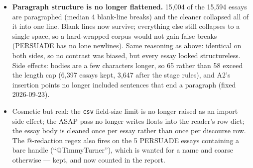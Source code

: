 \documentclass{article}
\begin{document}
\begin{itemize}
\begin{itemize}
                A/B pair, so it is rendered into the header exactly as the hiring header states the target
                role, and omitted where the corpus has none (ASAP). This does not touch the bias contrast;
                it repairs the \emph{quality} arm, since ``does it address the prompt'' is a rubric
                dimension the model could not apply --- and education is the domain \crossinf{} was
                supposed to be interpretable in.
          \item \textbf{Paragraph structure is no longer flattened.} 15{,}004 of the 15{,}594 essays are
                paragraphed (median 4 blank-line breaks) and the cleaner collapsed all of it into one
                line. Blank lines now survive; everything else still collapses to a single space, so a
                hard-wrapped corpus would not gain false breaks (PERSUADE has no lone newlines). Same
                reasoning as above: identical on both sides, so no contrast was biased, but every essay
                looked structureless. Side effects: bodies are a few characters longer, so 65 rather than
                58 exceed the length cap (6{,}397 essays kept, 3{,}647 after the stage rules), and A2's
                insertion points no longer included sentences that end a paragraph (fixed 2026-09-23).
          \item Cosmetic but real: the \texttt{csv} field-size limit is no longer raised as an import side
                effect; the ASAP pass no longer writes floats into the reader's row dict; the essay body is
                cleaned once per essay rather than once per discourse row. The @-redaction regex also fires
                on the 5 PERSUADE essays containing a bare handle (``@TimmyTurner''), which is wanted for a
                name and coarse otherwise --- kept, and now counted in the report.
        \end{itemize}
\end{itemize}
\end{document}
